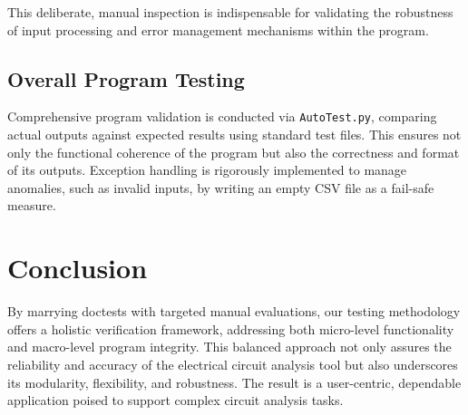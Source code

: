 \documentclass[conference]{IEEEtran}
\begin{document}
This deliberate, manual inspection is indispensable for validating the robustness of input processing and error management mechanisms within the program.

\subsection{\textbf{Overall Program Testing}}
Comprehensive program validation is conducted via \texttt{AutoTest.py}, comparing actual outputs against expected results using standard test files. This ensures not only the functional coherence of the program but also the correctness and format of its outputs. Exception handling is rigorously implemented to manage anomalies, such as invalid inputs, by writing an empty CSV file as a fail-safe measure.

\section{Conclusion}
By marrying doctests with targeted manual evaluations, our testing methodology offers a holistic verification framework, addressing both micro-level functionality and macro-level program integrity. This balanced approach not only assures the reliability and accuracy of the electrical circuit analysis tool but also underscores its modularity, flexibility, and robustness. The result is a user-centric, dependable application poised to support complex circuit analysis tasks.
\end{document}

